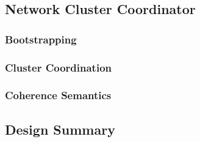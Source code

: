 \subsection{Network Cluster Coordinator}

\subsubsection{Bootstrapping}


\subsubsection{Cluster Coordination}

\subsubsection{Coherence Semantics}

\subsection{Design Summary}
